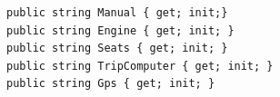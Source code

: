 %				



\begin{lstlisting}[caption={Inicjalizacja obiektu klasy \texttt{Car} ze niemutowalnymi właściwościami}, label={lab2/lst/immutableProperties}]
public string Manual { get; init;}
public string Engine { get; init; }
public string Seats { get; init; }
public string TripComputer { get; init; }
public string Gps { get; init; }
\end{lstlisting}


